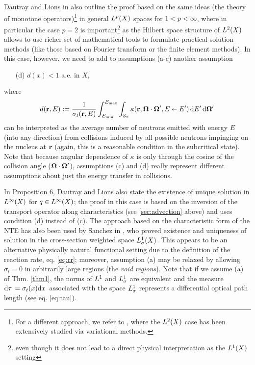 Dautray and Lions in 
\cite[\S2, Chap. XXI]{DautrayLions} also outline the proof based on the same ideas (the theory of monotone 
operators)\footnote{For a different approach, we refer to \cite[Chap. 3]{Agoshkov}, where the $\Lp[2](X)$ case has been extensively studied via variational methods.} in
general $\Lp(X)$ spaces for $1 < p < \infty$, where in particular the case $p = 2$ is important\footnote{even though it does not lead to a direct 
physical interpretation as the $\Lp[1](X)$ setting} as the Hilbert space structure of $\Lp[2](X)$ allows to use richer 
set of mathematical tools to formulate practical solution methods (like those based on Fourier transform or the finite 
element methods). In this case, however, we need to add to assumptions (a-c) another assumption
\begin{enumerate}
  \item[(d)] $d(x) < 1$ a.e. in $X$, 
\end{enumerate}
where
$$ d(\br,E) := 
  \frac{1}{\sigma_t(\br,E)}\int_{\Emin}^{\Emax}\int_{\Sphere} \kappa(\br,\bomega\cdot\bomega',
	    E\sla E')\,\d{E'}\d{\bomega'}
$$
can be interpreted as the average number of neutrons emitted with energy $E$ (into any direction) from
collisions induced by all possible neutrons impinging on the nucleus at $\br$ (again, this is a reasonable condition
in the subcritical state). Note that because angular dependence of $\kappa$ is only through the cosine of the collision
angle ($\bomega\cdot\bomega'$), assumptions (c) and (d) really represent different assumptions about just the energy
transfer in collisions.

In Proposition 6, Dautray and Lions also 
state the existence of unique solution in $\Lp[\infty](X)$ for $q\in \Lp[\infty](X)$; the proof in this case is based on
 the inversion of the transport operator along characteristics (see \ref{sec:advection} above) and uses condition (d)
 instead of (c).
 The approach based on the characteristic form of the NTE has also been used by Sanchez in \cite{Sanchez3}, who proved  
 existence and uniqueness of solution in the cross-section weighted space $\Lp[1]_{\sigma}(X)$.
 This appears to be an alternative physically natural functional setting due to the definition of the reaction rate, eq. 
 \eqref{eq:rr}; moreover, assumption (a) may be relaxed by allowing $\sigma_t = 0$ in arbitrarily large regions 
  (the \textit{void regions}). Note that if we assume (a) of Thm. \ref{thm1}, the norms of $\Lp[1]$ and
  $\Lp[1]_{\sigma}$ are equivalent and the measure $\d{\tau} = \sigma_t(x) \d{x}$ associated with the space
  $\Lp[1]_{\sigma}$ represents a differential optical path length (see eq. \eqref{eq:tau}).

